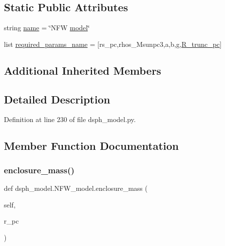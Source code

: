 \subsection*{Static Public Attributes}
\begin{DoxyCompactItemize}
\item 
string \hyperlink{classdsph__model_1_1NFW__model_a5cf6e836f1d377ae4d7e0708c109b8cb}{name} = \char`\"{}N\+FW \hyperlink{classdsph__model_1_1model}{model}\char`\"{}
\item 
list \hyperlink{classdsph__model_1_1NFW__model_ae08a05fd1593c131b89e7da6d228abb4}{required\+\_\+params\+\_\+name} = \mbox{[}\textquotesingle{}rs\+\_\+pc\textquotesingle{},\textquotesingle{}rhos\+\_\+\+Msunpc3\textquotesingle{},\textquotesingle{}a\textquotesingle{},\textquotesingle{}b\textquotesingle{},\textquotesingle{}g\textquotesingle{},\textquotesingle{}\hyperlink{namespacedsph__model_a03ec56ecf56f64e59a6be020a76a36f1}{R\+\_\+trunc\+\_\+pc}\textquotesingle{}\mbox{]}
\end{DoxyCompactItemize}
\subsection*{Additional Inherited Members}


\subsection{Detailed Description}


Definition at line 230 of file dsph\+\_\+model.\+py.



\subsection{Member Function Documentation}
\mbox{\label{classdsph__model_1_1NFW__model_a6cd2ef0f9d8ce7af26d332761af25655}} 
\subsubsection{\texorpdfstring{enclosure\+\_\+mass()}{enclosure\_mass()}}
{\footnotesize\ttfamily def dsph\+\_\+model.\+N\+F\+W\+\_\+model.\+enclosure\+\_\+mass (\begin{DoxyParamCaption}\item[{}]{self,  }\item[{}]{r\+\_\+pc }\end{DoxyParamCaption})}



